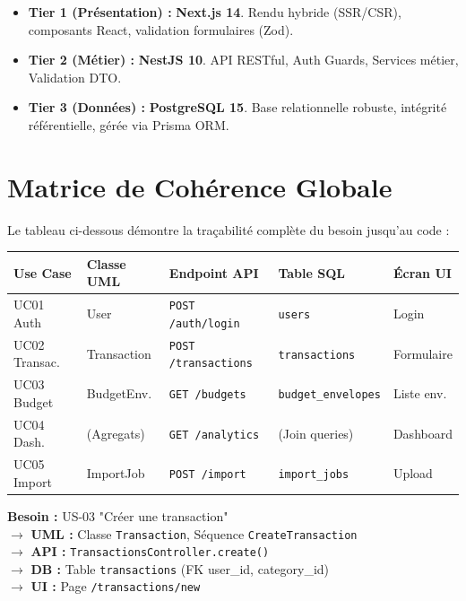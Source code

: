 \begin{itemize}
    \item \textbf{Tier 1 (Présentation) :} \textbf{Next.js 14}. Rendu hybride (SSR/CSR), composants React, validation formulaires (Zod).
    \item \textbf{Tier 2 (Métier) :} \textbf{NestJS 10}. API RESTful, Auth Guards, Services métier, Validation DTO.
    \item \textbf{Tier 3 (Données) :} \textbf{PostgreSQL 15}. Base relationnelle robuste, intégrité référentielle, gérée via Prisma ORM.
\end{itemize}

\section{Matrice de Cohérence Globale}

Le tableau ci-dessous démontre la traçabilité complète du besoin jusqu'au code :

\begin{center}
\small
\begin{tabular}{|p{}|p{}|p{}|p{}|p{}|}
\hline
\textbf{Use Case} & \textbf{Classe UML} & \textbf{Endpoint API} & \textbf{Table SQL} & \textbf{Écran UI} \\
\hline
UC01 Auth & User & \texttt{POST /auth/login} & \texttt{users} & Login \\
\hline
UC02 Transac. & Transaction & \texttt{POST /transactions} & \texttt{transactions} & Formulaire \\
\hline
UC03 Budget & BudgetEnv. & \texttt{GET /budgets} & \texttt{budget\_envelopes} & Liste env. \\
\hline
UC04 Dash. & (Agregats) & \texttt{GET /analytics} & (Join queries) & Dashboard \\
\hline
UC05 Import & ImportJob & \texttt{POST /import} & \texttt{import\_jobs} & Upload \\
\hline
\end{tabular}
\end{center}

\begin{tcolorbox}[colback=green!5!white,colframe=green!60!black,title=\textbf{Exemple de traçabilité : UC02 Transactions}]
\textbf{Besoin :} US-03 "Créer une transaction" \\
$\rightarrow$ \textbf{UML :} Classe \texttt{Transaction}, Séquence \texttt{CreateTransaction} \\
$\rightarrow$ \textbf{API :} \texttt{TransactionsController.create()} \\
$\rightarrow$ \textbf{DB :} Table \texttt{transactions} (FK user\_id, category\_id) \\
$\rightarrow$ \textbf{UI :} Page \texttt{/transactions/new}
\end{tcolorbox}

